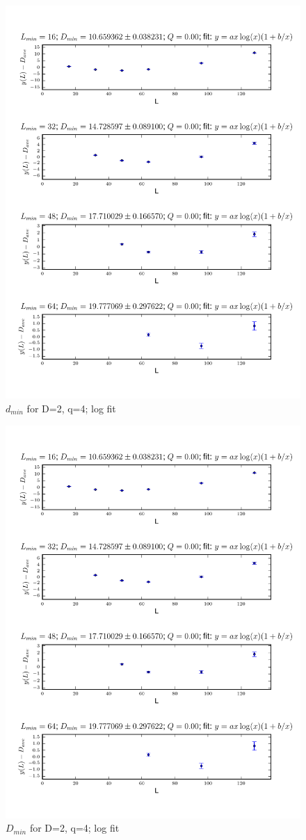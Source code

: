 \documentclass[pre,preprint]{revtex4}
\begin{document}

\begin{figure}[htp]
\centering
\includegraphics[width=.85\textwidth]{figures/d_min_D2q4_46_log_fig}
\caption{$d_{min}$ for D=2, q=4; log fit}\label{fig:4}
\end{figure}


\begin{figure}[htp]
\centering
\includegraphics[width=.9\textwidth]{figures/D_min_D2q4_46_log_fig}
\caption{$D_{min}$ for D=2, q=4; log fit}\label{fig:4}
\end{figure}
\end{document}
